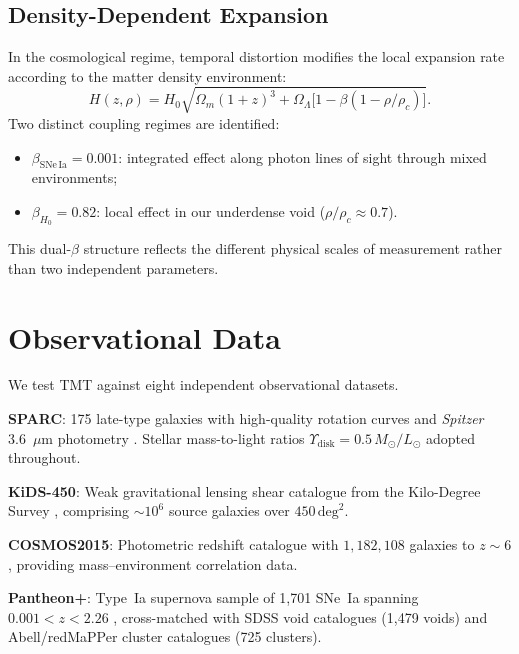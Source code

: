 \documentclass[manuscript,linenumbers]{aastex631}
\newcommand{\Msun}{M_{\odot}}
\newcommand{\HObs}{H_{\mathrm{0}}}
\begin{document}
\subsection{Density-Dependent Expansion}
\label{sec:expansion}

In the cosmological regime, temporal distortion modifies the local
expansion rate according to the matter density environment:
\begin{equation}
  H(z,\rho) = \HObs\sqrt{\Omega_{m}(1+z)^{3}
    + \Omega_{\Lambda}\bigl[1 - \beta(1-\rho/\rho_{c})\bigr]}.
  \label{eq:Hz}
\end{equation}
Two distinct coupling regimes are identified:
\begin{itemize}
  \item $\beta_{\mathrm{SNe\,Ia}} = 0.001$: integrated effect along
    photon lines of sight through mixed environments;
  \item $\beta_{\HObs} = 0.82$: local effect in our underdense void
    ($\rho/\rho_{c} \approx 0.7$).
\end{itemize}
This dual-$\beta$ structure reflects the different physical scales of
measurement rather than two independent parameters.

\section{Observational Data}
\label{sec:data}

We test TMT against eight independent observational datasets.

\textbf{SPARC}: 175 late-type galaxies with high-quality rotation
curves and \textit{Spitzer} 3.6~$\mu$m photometry \citep{Lelli2016}.
Stellar mass-to-light ratios $\Upsilon_{\mathrm{disk}} =
0.5\,\Msun/L_{\odot}$ adopted throughout.

\textbf{KiDS-450}: Weak gravitational lensing shear catalogue from the
Kilo-Degree Survey \citep{Hildebrandt2017}, comprising $\sim10^{6}$
source galaxies over $450\,\mathrm{deg}^{2}$.

\textbf{COSMOS2015}: Photometric redshift catalogue \citep{Laigle2016}
with $1{,}182{,}108$ galaxies to $z \sim 6$, providing
mass--environment correlation data.

\textbf{Pantheon+}: Type~Ia supernova sample of 1,701 SNe~Ia spanning
$0.001 < z < 2.26$ \citep{Scolnic2022}, cross-matched with SDSS void
catalogues (1,479 voids) and Abell/redMaPPer cluster catalogues
(725 clusters).
\end{document}
